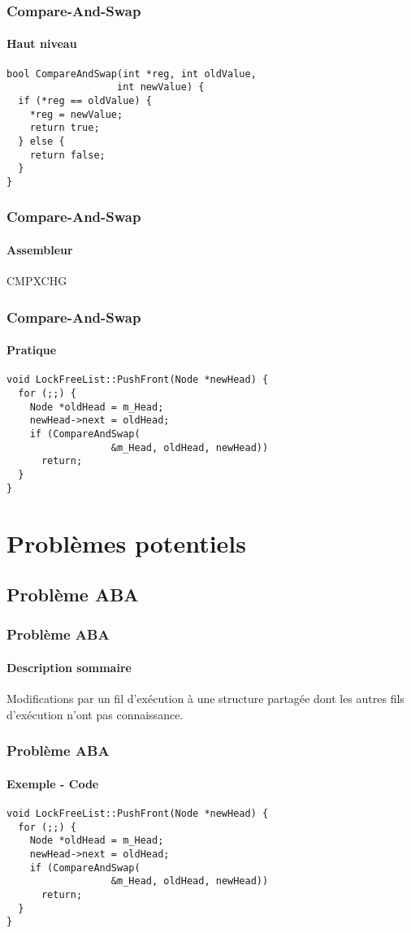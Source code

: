 \documentclass{beamer}
\begin{document}
\begin{frame}[fragile]
\frametitle{Compare-And-Swap}
\framesubtitle{Haut niveau}
\begin{lstlisting}
bool CompareAndSwap(int *reg, int oldValue,
                   int newValue) {                   
  if (*reg == oldValue) {
    *reg = newValue;
    return true;
  } else {
    return false;
  }
}
\end{lstlisting}
\end{frame}

\begin{frame}[fragile]
\frametitle{Compare-And-Swap}
\framesubtitle{Assembleur}
\begin{center}
\Huge CMPXCHG
\end{center}
\end{frame}

\begin{frame}[fragile]
\frametitle{Compare-And-Swap}
\framesubtitle{Pratique}
\begin{lstlisting}
void LockFreeList::PushFront(Node *newHead) {
  for (;;) {
    Node *oldHead = m_Head;
    newHead->next = oldHead;
    if (CompareAndSwap(
                  &m_Head, oldHead, newHead))
      return;
  }
}
\end{lstlisting}
\end{frame}

\section{Problèmes potentiels}
\subsection{Problème ABA}
\begin{frame}
\frametitle{Problème ABA}
\framesubtitle{Description sommaire}
Modifications par un fil d'exécution à une structure partagée dont les autres fils d'exécution n'ont pas connaissance.
\end{frame}

\begin{frame}[fragile]
\frametitle{Problème ABA}
\framesubtitle{Exemple - Code}
\begin{lstlisting}
void LockFreeList::PushFront(Node *newHead) {
  for (;;) {
    Node *oldHead = m_Head;
    newHead->next = oldHead;
    if (CompareAndSwap(
                  &m_Head, oldHead, newHead))
      return;
  }
}
\end{lstlisting}
\end{frame}
\end{document}
